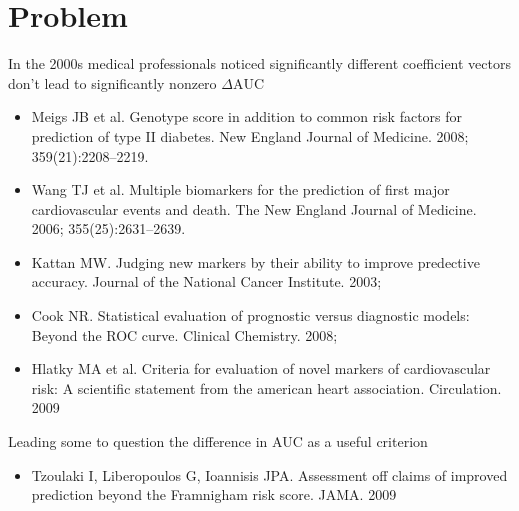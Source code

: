 \documentclass{beamer}
\newcommand{\aucdiff}{\Delta\text{AUC}}
\begin{document}
\section{Problem}
\begin{frame}

  In the 2000s medical professionals noticed significantly different
  coefficient vectors don't lead to significantly nonzero $\aucdiff$
\begin{footnotesize}
  \begin{itemize}
\item Meigs JB et al. Genotype score in addition to common risk factors for
prediction of type II diabetes. New England Journal of Medicine. 2008; 359(21):2208–2219.

\item Wang TJ et al. Multiple biomarkers for the prediction of
first major cardiovascular events and death. The New England Journal of Medicine. 2006;
355(25):2631–2639.

\item Kattan MW. Judging new markers by their ability to improve predective accuracy. Journal of the
National Cancer Institute. 2003;

\item Cook NR. Statistical evaluation of prognostic versus diagnostic models: Beyond the ROC curve.
Clinical Chemistry. 2008;

\item Hlatky MA et al. Criteria for evaluation of novel markers of cardiovascular risk: A
scientific statement from the american heart association. Circulation. 2009

\end{itemize}
\end{footnotesize}
Leading some to question the difference in AUC as a useful criterion
\begin{footnotesize}
  \begin{itemize}
\item Tzoulaki I, Liberopoulos G, Ioannisis JPA. Assessment off claims of improved prediction beyond
the Framnigham risk score. JAMA. 2009
\end{itemize}
\end{footnotesize}
\end{frame}
\end{document}
